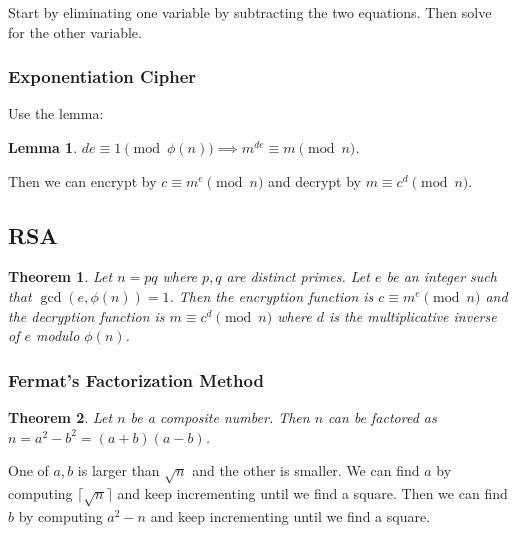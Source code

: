 \documentclass[letterpaper,12pt,oneside]{article}
\newtheorem{theorem}{Theorem}
\newtheorem*{lemma}{Lemma}
\begin{document}
Start by eliminating one variable by subtracting the two equations. Then solve for the other variable.
\subsubsection{Exponentiation Cipher}
Use the lemma: \begin{lemma}
    $de\equiv 1\pmod{\phi(n)} \implies m^{de}\equiv m\pmod{n}$.
\end{lemma}
Then we can encrypt by $c\equiv m^e\pmod{n}$ and decrypt by $m\equiv c^d\pmod{n}$.
\subsection{RSA}
\begin{theorem}
    Let $n=pq$ where $p,q$ are distinct primes. Let $e$ be an integer such that $\gcd(e,\phi(n)) = 1$. Then the encryption function is $c\equiv m^e\pmod{n}$ and the decryption function is $m\equiv c^d\pmod{n}$ where $d$ is the multiplicative inverse of $e$ modulo $\phi(n)$.
\end{theorem}
\subsubsection{Fermat's Factorization Method}
\begin{theorem}
    Let $n$ be a composite number. Then $n$ can be factored as $n = a^2-b^2 = (a+b)(a-b)$.
\end{theorem}
One of $a,b$ is larger than $\sqrt{n}$ and the other is smaller. We can find $a$ by computing $\lceil \sqrt{n}\rceil$ and keep incrementing until we find a square. Then we can find $b$ by computing $a^2-n$ and keep incrementing until we find a square.
\end{document}
